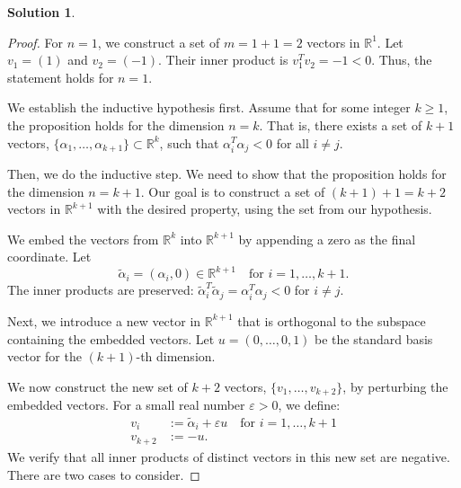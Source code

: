 \documentclass[12pt]{article}
\theoremstyle{definition}
\newtheorem*{solution}{\normalfont\textbf{Solution}}
\begin{document}
\begin{enumerate}[leftmargin=*]
\begin{solution}
\begin{proof}
                For \(n=1\), we construct a set of \(m = 1+1 = 2\) vectors in \( \mathbb{R}^1 \). Let \(v_1 = (1)\) and \(v_2 = (-1)\). Their inner product is \(v_1^T v_2 = -1 < 0\). Thus, the statement holds for \(n=1\).

                We establish the inductive hypothesis first. Assume that for some integer \(k \geq 1\), the proposition holds for the dimension \(n=k\). That is, there exists a set of \(k+1\) vectors, \(\{ \alpha_1, \ldots, \alpha_{k+1} \} \subset \mathbb{R}^k\), such that \(\alpha_i^T \alpha_j < 0\) for all \(i \neq j\).

                Then, we do the inductive step.
                We need to show that the proposition holds for the dimension \(n = k+1\). Our goal is to construct a set of \((k+1)+1 = k+2\) vectors in \( \mathbb{R}^{k+1} \) with the desired property, using the set from our hypothesis.

                We embed the vectors from \( \mathbb{R}^k \) into \( \mathbb{R}^{k+1} \) by appending a zero as the final coordinate. Let
                \[
                \tilde{\alpha}_i = (\alpha_i, 0) \in \mathbb{R}^{k+1} \quad \text{for } i = 1, \ldots, k+1.
                \]
                The inner products are preserved: \( \tilde{\alpha}_i^T \tilde{\alpha}_j = \alpha_i^T \alpha_j < 0 \) for \( i \neq j \).

                Next, we introduce a new vector in \( \mathbb{R}^{k+1} \) that is orthogonal to the subspace containing the embedded vectors. Let \( u = (0, \ldots, 0, 1) \) be the standard basis vector for the \((k+1)\)-th dimension.

                We now construct the new set of \(k+2\) vectors, \( \{v_1, \ldots, v_{k+2}\} \), by perturbing the embedded vectors. For a small real number \( \varepsilon > 0 \), we define:
                \begin{align*}
                    v_i &:= \tilde{\alpha}_i + \varepsilon u \quad \text{for } i = 1, \ldots, k+1 \\
                    v_{k+2} &:= -u.
                \end{align*}
                We verify that all inner products of distinct vectors in this new set are negative. There are two cases to consider.


\end{proof}
\end{solution}
\end{enumerate}
\end{document}
